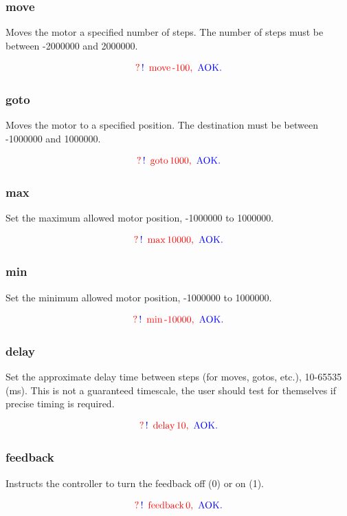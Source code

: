 \documentclass[10pt]{article}
\newcommand{\exchange}[2]{
\begin{equation}
 \nonumber \textcolor{red}{?} \, \textcolor{blue}{!} \, \textcolor{red}{\text { #1}} \,\textcolor{red}{\text{#2, }} \, \textcolor{blue}{\text{AOK.}}
 \end{equation}
}
\begin{document}

\subsubsection{move}
\label{move}
Moves the motor a specified number of steps. The number of steps must be between -2000000 and 2000000.         

\exchange{move}{-100}

\subsubsection{goto}
\label{goto}
Moves the motor to a specified position. The destination must be between -1000000 and 1000000.         

\exchange{goto}{1000}

\subsubsection{max}
\label{max}
Set the maximum allowed motor position, -1000000 to 1000000.         

\exchange{max}{10000}

\subsubsection{min}
\label{min}
Set the minimum allowed motor position, -1000000 to 1000000.         

\exchange{min}{-10000}

\subsubsection{delay}
\label{delay}
Set the approximate delay time between steps (for moves, gotos, etc.), 10-65535 (ms).         This is not a guaranteed timescale, the user should test for themselves if precise timing is required. 

\exchange{delay}{10}

\subsubsection{feedback}
\label{feedback}
Instructs the controller to turn the feedback off (0) or on (1). 

\exchange{feedback}{0}
\end{document}
